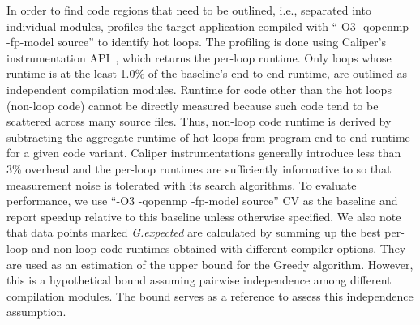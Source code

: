 In order to find code regions that need to be outlined, i.e., separated
into individual modules, \toolname profiles the target application
compiled with ``-O3 -qopenmp -fp-model source''  to identify hot loops.  The profiling is done using
Caliper's instrumentation API~\cite{caliper}, which returns the
per-loop runtime. Only loops whose runtime is at the least 1.0\% of
the baseline's end-to-end runtime, are outlined as independent
compilation modules. Runtime for code other than the hot loops
(non-loop code) cannot be directly measured because such code tend
to be scattered across many source files.  Thus, non-loop code runtime
is derived by subtracting the aggregate runtime of hot loops from
program end-to-end runtime for a given code variant.
%
Caliper instrumentations generally introduce less than 3\% overhead
and the per-loop runtimes are sufficiently informative to \toolname
so that measurement noise is tolerated with its search
algorithms.
To evaluate performance, we use ``-O3 -qopenmp -fp-model source'' CV  as
the baseline and report speedup relative to this
baseline unless otherwise specified.  We also note that data points marked {\em
G.expected} are calculated by summing up the best per-loop and non-loop
code runtimes obtained with different compiler options.
%
They are used as an estimation of the upper bound for the Greedy
algorithm. However, this is a hypothetical bound assuming pairwise
independence among different compilation modules. The bound serves as
a reference to assess this independence assumption.

